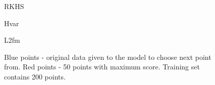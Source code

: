 \documentclass[a4paper]{article}
\begin{document}
\begin{figure}[h]
\begin{minipage}[h]{0.49\linewidth}
\end{minipage}
\hfill
\begin{minipage}[h]{0.49\linewidth}
 RKHS
\end{minipage}
\vfill
\begin{minipage}[h]{0.49\linewidth}
 Hvar
\end{minipage}
\hfill
\begin{minipage}[h]{0.49\linewidth}
 L2fm
\end{minipage}
\caption{Blue points - original data given to the model to choose next point from. Red points - 50 points with maximum score. Training set contains 200 points.}
\label{scoreplots}
\end{figure}
\end{document}
